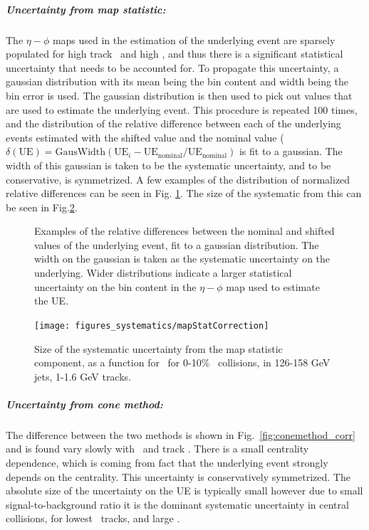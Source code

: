 \subparagraph{Uncertainty from map statistic:} 
The $\eta-\phi$ maps used in the estimation of the underlying event are sparsely populated for high track \pt\ and high \ptjet, and thus there is a significant statistical uncertainty that needs to be accounted for. To propagate this uncertainty, a gaussian distribution with its mean being the bin content and width being the bin error is used. The gaussian distribution is then used to pick out values that are used to estimate the underlying event. This procedure is repeated 100 times, and the distribution of the relative difference between each of the underlying events estimated with the shifted value and the nominal value ( $\delta (\mathrm{UE}) = \mathrm{GausWidth}(\mathrm{UE}_i - \mathrm{UE}_{\mathrm{nominal}} / \mathrm{UE}_{\mathrm{nominal}})$ is fit to a gaussian. The width of this gaussian is taken to be the systematic uncertainty, and to be conservative, is symmetrized. A few examples of the distribution of normalized relative differences can be seen in Fig. \ref{fig:gaus_diff}. The size of the systematic from this can be seen in Fig.\ref{fig:mapstat_corr}.

\begin{figure}
   \caption{Examples of the relative differences between the nominal and shifted values of the underlying event, fit to a gaussian distribution. The width on the gaussian is taken as the systematic uncertainty on the underlying. Wider distributions indicate a larger statistical uncertainty on the bin content in the $\eta-\phi$ map used to estimate the UE.}
      \label{fig:gaus_diff}
\end{figure}

\begin{figure}[h]
    \centerline{
       \texttt{[image: figures\_systematics/mapStatCorrection]}
    }
    \caption{Size of the systematic uncertainty from the map statistic component, as a function for \rvar\ for 0-10\% \pbpb\ collisions, in 126-158 GeV jets, 1-1.6 GeV tracks.}
    \label{fig:mapstat_corr}
 \end{figure}




\subparagraph{Uncertainty from cone method:} The difference between the two methods is shown in Fig.~\ref{fig:conemethod_corr} and is found vary slowly with \ptjet\ and track \pT. There is a  small centrality dependence, which is coming from fact that the underlying event strongly depends on the centrality.
This uncertainty is conservatively symmetrized. The absolute size of the uncertainty on the UE is typically small however due to small signal-to-background ratio it is the dominant systematic uncertainty in central collisions, for lowest \pT\ tracks, and large \rvar.

